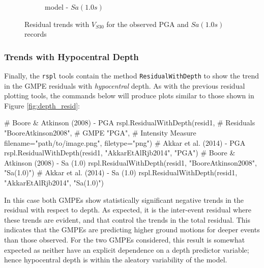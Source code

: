 \begin{figure}[htb]
\begin{subfigure}[b]{0.49\textwidth}
     \caption{\textcite{Akkar_etal2014} model - $Sa \left( {1.0 s} \right)$}
      \label{fig:sa1_vs30_akkar2014}
  \end{subfigure}
  \caption{Residual trends with $V_{S30}$ for the observed PGA and $Sa \left( {1.0 s} \right)$ records}
  \label{fig:vs30_resid}
\end{figure}

\subsubsection{Trends with Hypocentral Depth}

Finally, the \verb=rspl= tools contain the method \verb=ResidualWithDepth= to show the trend in the GMPE residuals with \emph{hypocentral} depth. As with the previous residual plotting tools, the commands below will produce plots similar to those shown in Figure \ref{fig:depth_resid}:

 \begin{python}[frame=single]
# Boore & Atkinson (2008)  - PGA
rspl.ResidualWithDepth(resid1,  # Residuals
                      "BooreAtkinson2008",  # GMPE
                      "PGA",   # Intensity Measure
                      filename="path/to/image.png",
                      filetype="png")
# Akkar et al. (2014)  - PGA
rspl.ResidualWithDepth(resid1, "AkkarEtAlRjb2014", "PGA") 
# Boore & Atkinson (2008)  - Sa (1.0)
rspl.ResidualWithDepth(resid1, "BooreAtkinson2008", "Sa(1.0)") 
# Akkar et al. (2014)  - Sa (1.0)
rspl.ResidualWithDepth(resid1, "AkkarEtAlRjb2014", "Sa(1.0)")                         
\end{python}

In this case both GMPEs show statistically significant negative trends in the residual with respect to depth. As expected, it is the inter-event residual where these trends are evident, and that control the trends in the total residual. This indicates that the GMPEs are predicting higher ground motions for deeper events than those observed. For the two GMPEs considered, this result is somewhat expected as neither have an explicit dependence on a depth predictor variable; hence hypocentral depth is within the aleatory variability of the model. 

